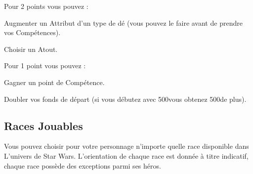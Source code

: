 Pour 2 points vous pouvez :
\begin{rebelist}
    \item Augmenter un Attribut d’un type de dé (vous pouvez le faire avant de prendre vos Compétences).
    \item Choisir un Atout.
\end{rebelist}

Pour 1 point vous pouvez :
\begin{rebelist}
    \item Gagner un point de Compétence.
    \item Doubler vos fonds de départ (si vous débutez avec 500\crg vous obtenez 500\crg de plus).
\end{rebelist}

\subsection{Races Jouables}
Vous pouvez choisir pour votre personnage n’importe quelle race disponible dans L’univers de Star Wars. L’orientation de chaque race est donnée à titre indicatif, chaque race possède des exceptions parmi ses héros.













%
%

\clearpage


\clearpage


\clearpage


\newpage


\clearpage 

